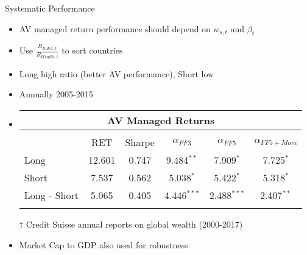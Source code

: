 \documentclass{beamer}
\begin{document}
\begin{frame}{Systematic Performance}
	\begin{itemize}[<+->]
		\item AV managed return performance should depend on $w_{s,t}$ and $\beta_{t}$
		\item Use $\frac{R_{Index,t}}{R_{Wealth,t}}$ to sort countries
		\item Long high ratio (better AV performance), Short low
		\item Annually 2005-2015
		\item 
		\begin{adjustbox}{width=.9\textwidth}
			\begin{tabular}{lccccc}
				\multicolumn{6}{c}{AV Managed Returns}\\
				\hline\\[-1.8ex]
				& RET & Sharpe & $\alpha_{FF3}$ & $\alpha_{FF5}$ & $\alpha_{FF5+Mom}$ \\
				\cline{2-6}
				Long & 12.601 & 0.747 & 9.484$^{**}$ & 7.909$^{*}$ & 7.725$^{*}$ \\
				Short & 7.537 & 0.562 & 5.038$^{*}$ & 5.422$^{*}$ & 5.318$^{*}$ \\
				Long - Short & 5.065 & 0.405 & 4.446$^{***}$ & 2.488$^{***}$ & 2.407$^{**}$ \\
				\hline\\[-1.8ex]
			\end{tabular}
		\end{adjustbox}
		$\dagger$ Credit Suisse annual reports on global wealth (2000-2017)
		\item Market Cap to GDP also used for robustness
	\end{itemize}

\end{frame}
\end{document}

